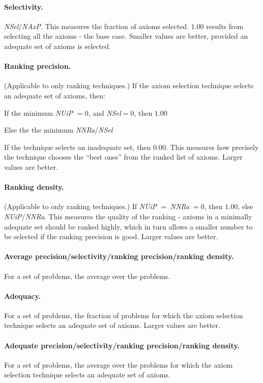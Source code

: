 \documentclass[EPiC]{easychair}
\newenvironment{packed_itemize}{
\vspace*{-0.5em}
\begin{itemize}
  \setlength{\partopsep}{0pt}
  \setlength{\itemsep}{1pt}
  \setlength{\parskip}{0pt}
  \setlength{\parsep}{0pt}
}{\end{itemize}}
\begin{document}
\paragraph{Selectivity.}
\emph{NSel}$/$\emph{NAxP}.
This measures the fraction of axioms selected.
$1.00$ results from selecting all the axioms - the base case.
Smaller values are better, provided an adequate set of axioms is selected.

\paragraph{Ranking precision.}
(Applicable to only ranking techniques.)
If the axiom selection technique selects an adequate set of axioms, then:
\begin{packed_itemize}
\item If the minimum \emph{NUiP} $= 0$, and \emph{NSel}$ = 0$, then $1.00$
\item Else the the minimum \emph{NNRa}$/$\emph{NSel}
\end{packed_itemize}
If the technique selects an inadequate set, then $0.00$.
This measures how precisely the technique chooses the ``best ones'' from
the ranked list of axioms.
Larger values are better.

\paragraph{Ranking density.}
(Applicable to only ranking techniques.)
If \emph{NUiP}$\;=\;$\emph{NNRa}$\;= 0$, then $1.00$, else
\emph{NUiP}$/$\emph{NNRa}.
This measures the quality of the ranking - axioms in a minimally adequate 
set should be ranked highly, which in turn allows a smaller number to be 
selected if the ranking precision is good.
Larger values are better.

\paragraph{Average precision/selectivity/ranking precision/ranking density.}
For a set of problems, the average over the problems.

\paragraph{Adequacy.}
For a set of problems, the fraction of problems for which the axiom 
selection technique selects an adequate set of axioms.
Larger values are better.

\paragraph{Adequate precision/selectivity/ranking precision/ranking density.}
For a set of problems, the average over the problems for which the axiom
selection technique selects an adequate set of axioms.
\end{document}
